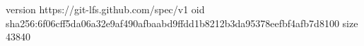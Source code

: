 version https://git-lfs.github.com/spec/v1
oid sha256:6f06cff5da06a32e9af490afbaabd9ffdd1b8212b3da95378eefbf4afb7d8100
size 43840

